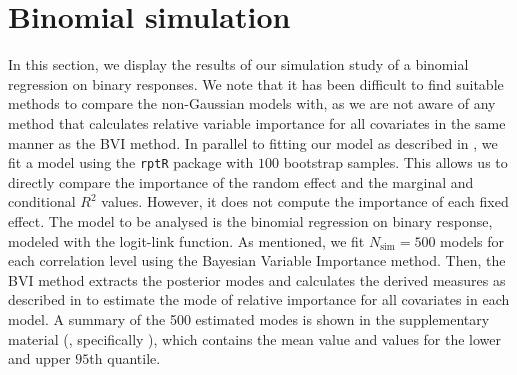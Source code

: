 \section{Binomial simulation}
In this section, we display the results of our simulation study of a binomial regression on binary responses. We note that it has been difficult to find suitable methods to compare the non-Gaussian models with, as we are not aware of any method that calculates relative variable importance for all covariates in the same manner as the BVI method. In parallel to fitting our model as described in , we fit a model using the \texttt{rptR} package with $100$ bootstrap samples. This allows us to directly compare the importance of the random effect and the marginal and conditional $R^2$ values. However, it does not compute the importance of each fixed effect. The model to be analysed is the binomial regression on binary response, modeled with the logit-link function. As mentioned, we fit \( N_{\text{sim}} = 500 \) models for each correlation level using the Bayesian Variable Importance method. Then, the BVI method extracts the posterior modes and calculates the derived measures as described in  to estimate the mode of relative importance for all covariates in each model. A summary of the 500 estimated modes is shown in the supplementary material (, specifically ), which contains the mean value and values for the lower and upper $95$th quantile.
